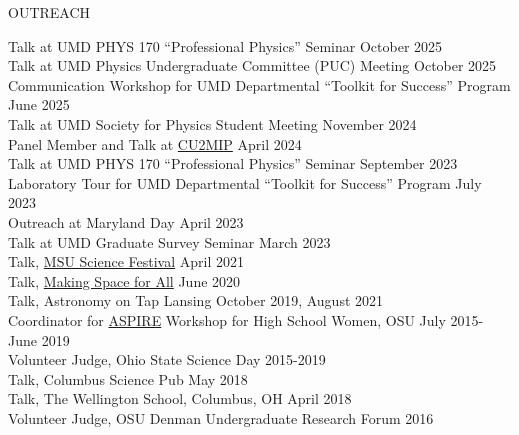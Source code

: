\documentclass{resume} %
\begin{document}
\begin{rSection}{OUTREACH}

Talk at UMD PHYS 170 ``Professional Physics'' Seminar \hfill October 2025 \\
Talk at UMD Physics Undergraduate Committee (PUC) Meeting  \hfill October 2025 \\
Communication Workshop for UMD Departmental ``Toolkit for Success'' Program \hfill June 2025 \\
Talk at UMD Society for Physics Student Meeting  \hfill November 2024 \\
Panel Member and Talk at \href{https://cu2mip.physics.umd.edu}{CU2MIP}   \hfill April 2024 \\
Talk at UMD PHYS 170 ``Professional Physics'' Seminar \hfill September 2023 \\
Laboratory Tour for UMD Departmental ``Toolkit for Success'' Program \hfill July 2023 \\
Outreach at Maryland Day \hfill April 2023 \\
Talk at UMD Graduate Survey Seminar  \hfill March 2023 \\
Talk, \href{https://sciencefestival.msu.edu/schools/virtual-school-programs}{MSU Science Festival} \hfill April 2021 \\
Talk, \href{https://astronomy.osu.edu/events/making-space-all-chasing-ghost-particle}{Making Space for All} \hfill June 2020 \\
Talk, Astronomy on Tap Lansing \hfill October 2019, August 2021 \\
Coordinator for \href{u.osu.edu/aspire}{ASPIRE} Workshop for High School Women, OSU \hfill July 2015-June 2019\\
Volunteer Judge, Ohio State Science Day \hfill 2015-2019\\
Talk, Columbus Science Pub \hfill  May 2018\\
Talk, The Wellington School, Columbus, OH \hfill April 2018\\
Volunteer Judge, OSU Denman Undergraduate Research Forum \hfill 2016\\
\end{rSection}
\vspace{-0.30cm}
\end{document}
